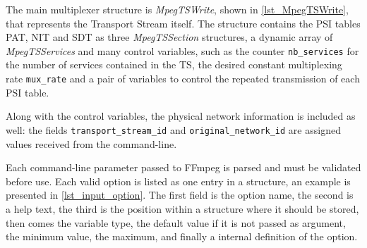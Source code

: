 \documentclass[
	12pt,				%
	openright,			%
	twoside,			%
	a4paper,			%
	brazil,
	french,				%
	english
	]{abntex2}
\begin{document}
The main multiplexer structure is \textit{MpegTSWrite}, shown in \autoref{lst_MpegTSWrite}, that represents the Transport Stream itself. The structure contains the PSI tables PAT, NIT and SDT as three \textit{MpegTSSection} structures, a dynamic array of \textit{MpegTSServices} and many control variables, such as the counter \texttt{nb\_services} for the number of services contained in the TS, the desired constant multiplexing rate \texttt{mux\_rate} and a pair of variables to control the repeated transmission of each PSI table.

Along with the control variables, the physical network information is included as well: the fields \texttt{transport\_stream\_id} and \texttt{original\_network\_id} are assigned values received from the command-line.

Each command-line parameter passed to FFmpeg is parsed and must be validated before use. Each valid option is listed as one entry in a structure, an example is presented in \autoref{lst_input_option}. The first field is the option name, the second is a help text, the third is the position within a structure where it should be stored, then comes the variable type, the default value if it is not passed as argument, the minimum value, the maximum, and finally a internal definition of the option.


\end{document}

